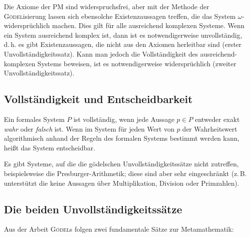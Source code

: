 Die Axiome der PM sind widerspruchsfrei, aber mit der Methode der \textsc{Gödel}isierung
lassen sich ebensolche Existenzaussagen treffen, die das System $\omega$-widersprüchlich
machen. Dies gilt für alle ausreichend komplexen
Systeme. Wenn ein System ausreichend komplex ist, dann ist es notwendigerweise unvollständig,
d.\,h. es gibt Existenzaussagen, die nicht aus den Axiomen herleitbar sind (erster
Unvollständigkeitssatz). Kann man jedoch die
Vollständigkeit des ausreichend-komplexen Systems beweisen, ist es notwendigerweise
widersprüchlich (zweiter Unvollständigkeitssatz).

\subsection*{Vollständigkeit und Entscheidbarkeit}

Ein formales System $P$ ist vollständig, wenn jede Aussage $p \in P$ entweder
exakt \textit{wahr} oder \textit{falsch} ist. Wenn im System für jeden Wert
von $p$ der  Wahrheitswert algorithmisch anhand der Regeln des
formalen Systems bestimmt werden kann, heißt das System \frq entscheidbar\flq.

Es gibt Systeme, auf die die gödelschen Unvollständigkeitssätze nicht zutreffen, beispielsweise die Presburger-Arithmetik;
diese sind aber sehr eingeschränkt
(z.\,B. unterstützt die  keine Aussagen über Multiplikation,
Division oder Primzahlen).

\subsection*{Die beiden Unvollständigkeitssätze}

Aus der Arbeit \textsc{Gödel}s folgen zwei fundamentale Sätze zur Metamathematik:

